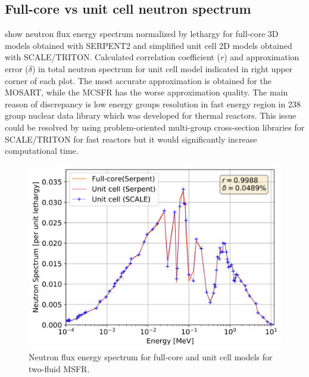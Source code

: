 \documentclass{anstrans}
\begin{document}
\subsection{Full-core vs unit cell neutron spectrum} 
\label{sec:spectrum}
 show neutron flux energy spectrum normalized by lethargy for full-core 3D models obtained with SERPENT2 and simplified unit cell 2D models obtained with SCALE/TRITON. Calculated correlation coefficient ($r$) and approximation error ($\delta$) in total neutron spectrum for unit cell model indicated in right upper corner of each plot. The most accurate approximation is obtained for the \gls{MOSART}, while the \gls{MCSFR} has the worse approximation quality. The main reason of discrepancy is low energy groups resolution in fast energy region in 238 group nuclear data library which was developed for thermal reactors. This issue could be resolved by using problem-oriented multi-group cross-section libraries for SCALE/TRITON for fast reactors but it would significantly increase computational time.
\begin{figure}[!htb]
  \centering
  \includegraphics[scale=0.585]{./Figures/msfr_full_vs_unit_spectrum.png}
  \caption{Neutron flux energy spectrum for full-core and unit cell models for two-fluid \gls{MSFR}.}   
  \label{fig:spectrum_msfr}
\end{figure}
\end{document}
